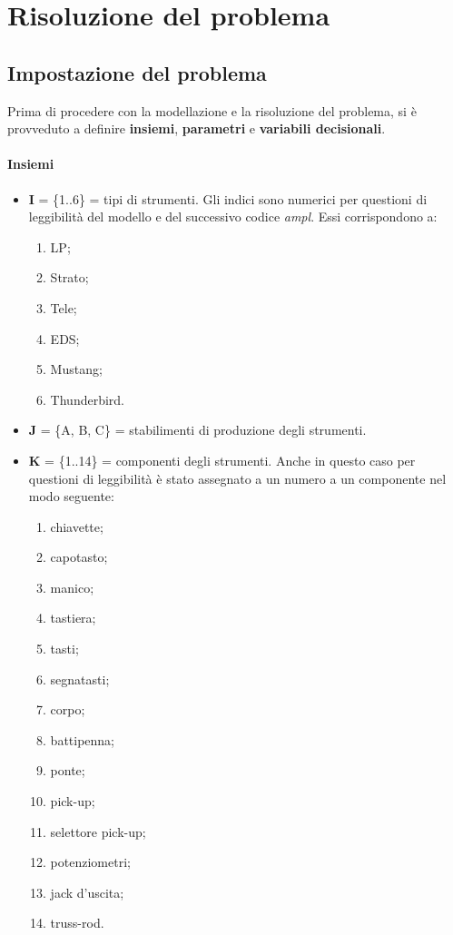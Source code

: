 \newpage
\section{Risoluzione del problema}
\subsection{Impostazione del problema}
Prima di procedere con la modellazione e la risoluzione del problema, si è provveduto a definire \textbf{insiemi}, \textbf{parametri} e \textbf{variabili decisionali}.
\paragraph*{Insiemi}
\begin{itemize}
\item[] \textbf{I} = \{1..6\} = tipi di strumenti. Gli indici sono numerici per questioni di leggibilità del modello e del successivo codice \textit{ampl}. Essi corrispondono a:
\begin{enumerate}
\item LP;
\item Strato;
\item Tele;
\item EDS;
\item Mustang;
\item Thunderbird.
\end{enumerate}
\item[] \textbf{J} = \{A, B, C\} = stabilimenti di produzione degli strumenti. 
\item[] \textbf{K} = \{1..14\} = componenti degli strumenti. Anche in questo caso per questioni di leggibilità è stato assegnato a un numero a un componente nel modo seguente:
\begin{enumerate}
\item chiavette;
\item capotasto;
\item manico;
\item tastiera;
\item tasti;
\item segnatasti;
\item corpo;
\item battipenna;
\item ponte;
\item pick-up;
\item selettore pick-up;
\item potenziometri;
\item jack d'uscita;
\item truss-rod.

\end{enumerate}
\end{itemize}
